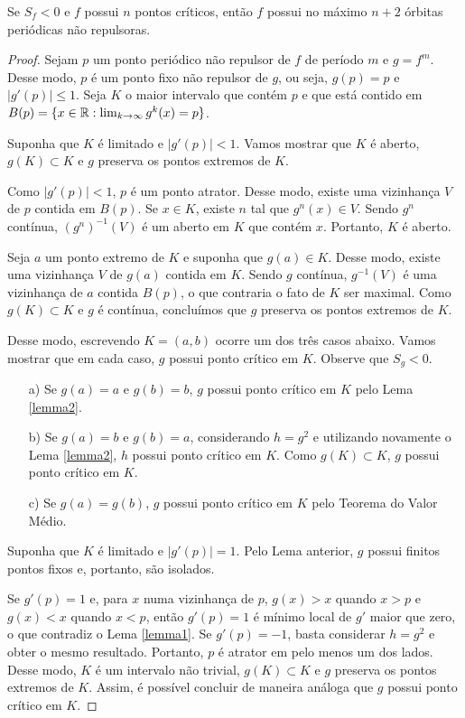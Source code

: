 \begin{theorem}[Singer]
Se $S_f < 0$ e $f$ possui $n$ pontos críticos, então $f$ possui no máximo $n+2$ órbitas periódicas não repulsoras.
\end{theorem}

\begin{proof}
Sejam $p$ um ponto periódico não repulsor de $f$ de período $m$ e $g = f^m$. Desse modo, $p$ é um ponto fixo não repulsor de $g$, ou seja, $g(p) = p$ e $|g'(p)| \leq 1$. Seja $K$ o maior intervalo que contém $p$ e que está contido em $B(p) = \{ x \in \mathbb{R} : \lim_{k \to \infty} g^k(x) = p \}$.

Suponha que $K$ é limitado e $|g'(p)| < 1$. Vamos mostrar que $K$ é aberto, $g(K) \subset K$ e $g$ preserva os pontos extremos de $K$.

Como $|g'(p)| < 1$, $p$ é um ponto atrator. Desse modo, existe uma vizinhança $V$ de $p$ contida em $B(p)$. Se $x \in K$, existe $n$ tal que $g^n(x) \in V$. Sendo $g^n$ contínua, $(g^n)^{-1}(V)$ é um aberto em $K$ que contém $x$. Portanto, $K$ é aberto.

Seja $a$ um ponto extremo de $K$ e suponha que $g(a) \in K$. Desse modo, existe uma vizinhança $V$ de $g(a)$ contida em $K$. Sendo $g$ contínua, $g^{-1}(V)$ é uma vizinhança de $a$ contida $B(p)$, o que contraria o fato de $K$ ser maximal. Como $g(K) \subset K$ e $g$ é contínua, concluímos que $g$ preserva os pontos extremos de $K$.

        Desse modo, escrevendo $K = (a, b)$ ocorre um dos três casos abaixo. Vamos mostrar que em cada caso, $g$ possui ponto crítico em $K$. Observe que $S_g < 0$.

\begin{enumerate}
\item[a)] Se $g(a) = a$ e $g(b) = b$, $g$ possui ponto crítico em $K$ pelo Lema \ref{lemma2}.
\item[b)] Se $g(a) = b$ e $g(b) = a$,  considerando $h = g^2$ e utilizando novamente o Lema \ref{lemma2}, $h$ possui ponto crítico em $K$. Como $g(K) \subset K$, $g$ possui ponto crítico em $K$.
\item[c)] Se $g(a) = g(b)$, $g$ possui ponto crítico em $K$ pelo Teorema do Valor Médio.
\end{enumerate}

Suponha que $K$ é limitado e $|g'(p)| = 1$. Pelo Lema anterior, $g$ possui finitos pontos fixos e, portanto, são isolados.

Se $g'(p) = 1$ e, para $x$ numa vizinhança de $p$, $g(x) > x$ quando $x > p$ e $g(x) < x$ quando $x < p$, então $g'(p) = 1$ é mínimo local de $g'$ maior que zero, o que contradiz o Lema \ref{lemma1}. Se $g'(p)=-1$, basta considerar $h=g^2$ e obter o mesmo resultado. Portanto, $p$ é atrator em pelo menos um dos lados. Desse modo, $K$ é um intervalo não trivial, $g(K) \subset K$ e $g$ preserva os pontos extremos de $K$. Assim, é possível concluir de maneira análoga que $g$ possui ponto crítico em $K$.


\end{proof}
